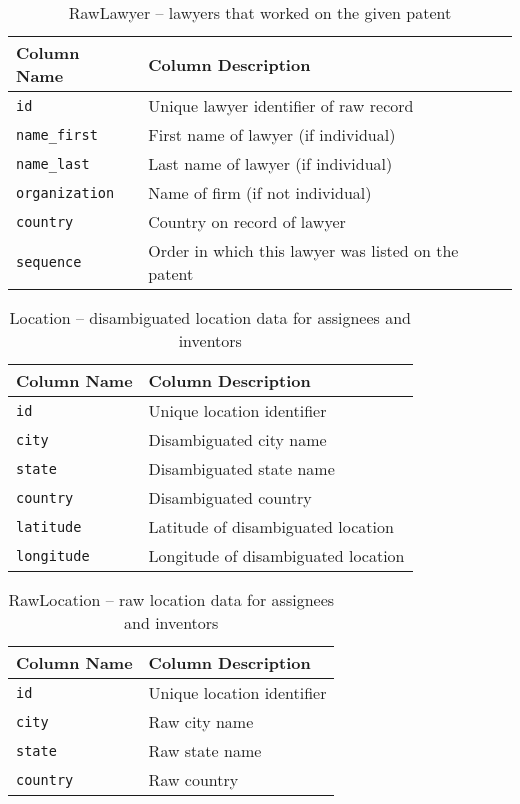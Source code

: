 \begin{table}[ht]
\center
\begin{tabular}{| l | l |}
\hline
Column Name & Column Description \\
\hline
\verb`id` & Unique lawyer identifier of raw record \\
\verb`name_first` & First name of lawyer (if individual) \\
\verb`name_last` & Last name of lawyer (if individual) \\
\verb`organization` & Name of firm (if not individual) \\
\verb`country` & Country on record of lawyer \\
\verb`sequence` & Order in which this lawyer was listed on the patent \\
\hline
\end{tabular}
\caption{RawLawyer -- lawyers that worked on the given patent}
\end{table}

\begin{table}[ht]
\center
\begin{tabular}{| l | l |}
\hline
Column Name & Column Description \\
\hline
\verb`id` & Unique location identifier \\
\verb`city` & Disambiguated city name \\
\verb`state` & Disambiguated state name \\
\verb`country` & Disambiguated country \\
\verb`latitude` & Latitude of disambiguated location \\
\verb`longitude` & Longitude of disambiguated location \\
\hline
\end{tabular}
\caption{Location -- disambiguated location data for assignees and inventors}
\end{table}

\begin{table}[ht]
\center
\begin{tabular}{| l | l |}
\hline
Column Name & Column Description \\
\hline
\verb`id` & Unique location identifier \\
\verb`city` & Raw city name \\
\verb`state` & Raw state name \\
\verb`country` & Raw country \\
\hline
\end{tabular}
\caption{RawLocation -- raw location data for assignees and inventors}
\end{table}


